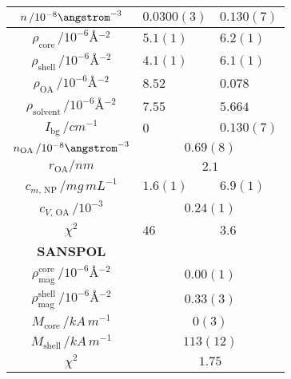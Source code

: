 \documentclass[\main/dresen_thesis.tex]{subfiles}
\begin{document}
\begin{table}[!htbp]
\begin{tabular}{ c | l | l }
        \hline
        \rule{0pt}{2ex} $n \, / 10^{-8} \angstrom^{-3}$                              & $0.0300(3)$     & $0.130(7)$\\
        \hline
        \rule{0pt}{2ex} $\rho_\mathrm{core}    \, / \unit{10^{-6} \angstrom^{-2}}$   & $5.1(1)$ & $6.2(1)$\\
        \rule{0pt}{2ex} $\rho_\mathrm{shell}   \, / \unit{10^{-6} \angstrom^{-2}}$   & $4.1(1)$ & $6.1(1)$\\
        \rule{0pt}{2ex} $\rho_\mathrm{OA}      \, / \unit{10^{-6} \angstrom^{-2}}$   & $8.52$   & $0.078$\\
        \rule{0pt}{2ex} $\rho_\mathrm{solvent} \, / \unit{10^{-6} \angstrom^{-2}}$   & $7.55$   & $5.664$\\
        \rule{0pt}{2ex} $I_\mathrm{bg} \, / \unit{cm^{-1}}$                          & $0$      & $0.130(7)$\\
        \hline
        \rule{0pt}{2ex} $n_\mathrm{OA} \, / 10^{-8} \angstrom^{-3}$                  & \multicolumn{2}{c}{$0.69(8)$}\\
        \rule{0pt}{2ex} $r_\mathrm{OA} / \unit{nm}$                                  & \multicolumn{2}{c}{$2.1$}\\
        \hline
        \rule{0pt}{2ex} $c_{m, \, \mathrm{NP}} \, / \unit{mg\, mL^{-1}}$             & $1.6(1)$  & $6.9(1)$\\
        \rule{0pt}{2ex} $c_{V, \, \mathrm{OA}} \, / \unit{10^{-3}}$                  & \multicolumn{2}{c}{$0.24(1)$}\\
        \hline
        \rule{0pt}{2ex} $\chi^2$                                                     & $46$     & $3.6$\\
        \hline
        \textbf{SANSPOL}\\
        \hline
        \rule{0pt}{2ex} $\rho_\mathrm{mag}^\mathrm{core} \, / \unit{10^{-6} \angstrom^{-2}}$ & \multicolumn{2}{c}{$0.00(1)$}\\
        \rule{0pt}{2ex} $\rho_\mathrm{mag}^\mathrm{shell} \, / \unit{10^{-6} \angstrom^{-2}}$& \multicolumn{2}{c}{$0.33(3)$}\\
        \rule{0pt}{2ex} $M_\mathrm{core} \, / \unit{kA \,m^{-1}}$                    & \multicolumn{2}{c}{$0(3)$}\\
        \rule{0pt}{2ex} $M_\mathrm{shell} \, / \unit{kA \,m^{-1}}$                   & \multicolumn{2}{c}{$113(12)$}\\
        \hline
        \rule{0pt}{2ex} $\chi^2$                                                     & \multicolumn{2}{c}{$1.75$}\\
      \end{tabular}
    \end{table}
\end{document}
